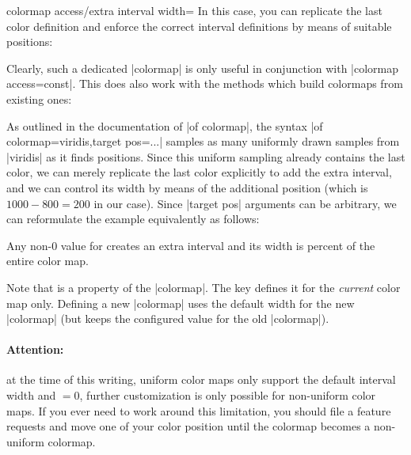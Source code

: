 \begin{pgfplotskey}{colormap access/extra interval width=}
	In this case, you can replicate the last color definition and enforce the correct interval definitions by means of suitable positions:
\begin{codeexample}[]
\pgfplotscolorbardrawstandalone[
	colormap={example}{%
		color(0)=(blue)
		color(333)=(red)
		color(666)=(black)
		color(1000)=(black)
	},
	colorbar horizontal,
	colorbar style={xtick=data},
	colormap access=const,
	colormap access/extra interval width=0]
\end{codeexample}
	Clearly, such a dedicated |colormap| is only useful in conjunction with |colormap access=const|. This does also work with the methods which build colormaps from existing ones:
\begin{codeexample}[]
\pgfplotscolorbardrawstandalone[
	colormap={example}{%
	  of colormap={viridis, 
	  	target pos={0,10,200,700,750,800}
	  }
	  color of colormap(1000)=(1000 of viridis)
	},
	colorbar horizontal,
	colormap access=const,
	colormap access/extra interval width=0]
\end{codeexample}
	As outlined in the documentation of |of colormap|, the syntax |of colormap={viridis,target pos=...}| samples as many uniformly drawn samples from |viridis| as it finds positions. Since this uniform sampling already contains the last color, we can merely replicate the last color explicitly to add the extra interval, and we can control its width by means of the additional position (which is $1000-800=200$ in our case). Since |target pos| arguments can be arbitrary, we can reformulate the example equivalently as follows:
\begin{codeexample}[]
\pgfplotscolorbardrawstandalone[
	colormap={example}{%
	  of colormap={viridis, 
	  	target pos={0,1000,20000,70000,75000,80000}
	  }
	  color of colormap(100000)=(1000 of viridis)
	},
	colorbar horizontal,
	colormap access=const,
	colormap access/extra interval width=0]
\end{codeexample}

	Any non-$0$ value for  creates an extra interval and its width is  percent of the entire color map.

	Note that  is a property of the |colormap|. The key defines it for the \emph{current} color map only. Defining a new |colormap| uses the default width for the new |colormap| (but keeps the configured value for the old |colormap|).

	\paragraph{Attention:} at the time of this writing, uniform color maps only support the default interval width and $=0$, further customization is only possible for non-uniform color maps. If you ever need to work around this limitation, you should file a feature requests and move one of your color position until the colormap becomes a non-uniform colormap.
	
\end{pgfplotskey}
